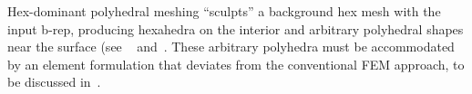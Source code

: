 Hex-dominant polyhedral meshing ``sculpts'' a background hex mesh with the input b-rep, producing hexahedra on the interior and arbitrary polyhedral shapes near the surface (see ~ and~. These arbitrary polyhedra must be accommodated by an element formulation that deviates from the conventional FEM approach, to be discussed in~.
\begin{figure}[htbp!]
\centering
{}		
\end{figure}
